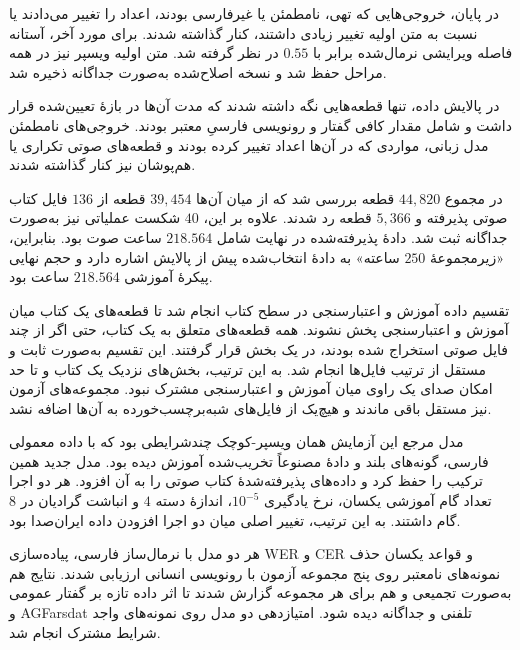 
در پایان، خروجی‌هایی که تهی، نامطمئن یا غیرفارسی بودند، اعداد را تغییر می‌دادند یا نسبت به متن اولیه تغییر زیادی داشتند، کنار گذاشته شدند. برای مورد آخر، آستانه فاصله ویرایشی نرمال‌شده برابر با $0.55$ در نظر گرفته شد. متن اولیه ویسپر نیز در همه مراحل حفظ شد و نسخه اصلاح‌شده به‌صورت جداگانه ذخیره شد.


در پالایش داده، تنها قطعه‌هایی نگه داشته شدند که مدت آن‌ها در بازهٔ تعیین‌شده قرار داشت و شامل مقدار کافی گفتار و رونویسی فارسیِ معتبر بودند. خروجی‌های نامطمئن مدل زبانی، مواردی که در آن‌ها اعداد تغییر کرده بودند و قطعه‌های صوتی تکراری یا هم‌پوشان نیز کنار گذاشته شدند.

در مجموع $44{,}820$ قطعه بررسی شد که از میان آن‌ها $39{,}454$ قطعه از $136$ فایل کتاب صوتی پذیرفته و $5{,}366$ قطعه رد شدند. علاوه بر این، $40$ شکست عملیاتی نیز به‌صورت جداگانه ثبت شد. دادهٔ پذیرفته‌شده در نهایت شامل $218.564$ ساعت صوت بود. بنابراین، «زیرمجموعهٔ $250$ ساعته» به دادهٔ انتخاب‌شده پیش از پالایش اشاره دارد و حجم نهایی پیکرهٔ آموزشی $218.564$ ساعت بود.

تقسیم داده آموزش و اعتبارسنجی در سطح کتاب انجام شد تا قطعه‌های یک کتاب میان آموزش و اعتبارسنجی پخش نشوند. همه قطعه‌های متعلق به یک کتاب، حتی اگر از چند فایل صوتی استخراج شده بودند، در یک بخش قرار گرفتند. این تقسیم به‌صورت ثابت و مستقل از ترتیب فایل‌ها انجام شد. به این ترتیب، بخش‌های نزدیک یک کتاب و تا حد امکان صدای یک راوی میان آموزش و اعتبارسنجی مشترک نبود. مجموعه‌های آزمون نیز مستقل باقی ماندند و هیچ‌یک از فایل‌های شبه‌برچسب‌خورده به آن‌ها اضافه نشد.



مدل مرجع این آزمایش همان ویسپر-کوچک چندشرایطی بود که با داده معمولی فارسی، گونه‌های بلند و دادهٔ مصنوعاً تخریب‌شده آموزش دیده بود. مدل جدید همین ترکیب را حفظ کرد و داده‌های پذیرفته‌شدهٔ کتاب صوتی را به آن افزود. هر دو اجرا تعداد گام آموزشی یکسان، نرخ یادگیری $10^{-5}$، اندازهٔ دسته $4$ و انباشت گرادیان در $8$ گام داشتند. به این ترتیب، تغییر اصلی میان دو اجرا افزودن داده ایران‌صدا بود.

هر دو مدل با نرمال‌ساز فارسی، پیاده‌سازی WER و CER و قواعد یکسان حذف نمونه‌های نامعتبر روی پنج مجموعه آزمون با رونویسی انسانی ارزیابی شدند. نتایج هم به‌صورت تجمیعی و هم برای هر مجموعه گزارش شدند تا اثر داده تازه بر گفتار عمومی و AGFarsdat تلفنی و  جداگانه دیده شود. امتیازدهی دو مدل روی نمونه‌های واجد شرایط مشترک انجام شد.

